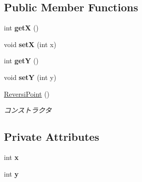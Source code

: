 \subsection*{Public Member Functions}
\begin{DoxyCompactItemize}
\item 
\mbox{\label{classjp_1_1gr_1_1java__conf_1_1yuta__yoshinaga_1_1reversi_1_1model_1_1_reversi_point_a9deacf20cc344a6ce93f5130007520d4}} 
int {\bfseries getX} ()
\item 
\mbox{\label{classjp_1_1gr_1_1java__conf_1_1yuta__yoshinaga_1_1reversi_1_1model_1_1_reversi_point_aa4fc225099dad8c9ca909d498d8a951a}} 
void {\bfseries setX} (int x)
\item 
\mbox{\label{classjp_1_1gr_1_1java__conf_1_1yuta__yoshinaga_1_1reversi_1_1model_1_1_reversi_point_a372b0b4d2fce6bfbebfe2e3255b04363}} 
int {\bfseries getY} ()
\item 
\mbox{\label{classjp_1_1gr_1_1java__conf_1_1yuta__yoshinaga_1_1reversi_1_1model_1_1_reversi_point_a831d47ed878457d9b6eb03dc172cbadc}} 
void {\bfseries setY} (int y)
\item 
\mbox{\hyperlink{classjp_1_1gr_1_1java__conf_1_1yuta__yoshinaga_1_1reversi_1_1model_1_1_reversi_point_a0d214a37c3858ca54e26cc6d5adb2c0b}{Reversi\+Point}} ()
\begin{DoxyCompactList}\small\item\em コンストラクタ \end{DoxyCompactList}\end{DoxyCompactItemize}
\subsection*{Private Attributes}
\begin{DoxyCompactItemize}
\item 
\mbox{\label{classjp_1_1gr_1_1java__conf_1_1yuta__yoshinaga_1_1reversi_1_1model_1_1_reversi_point_af41c34bc1ea9531eb815cfc74bccd0c1}} 
int {\bfseries x}
\item 
\mbox{\label{classjp_1_1gr_1_1java__conf_1_1yuta__yoshinaga_1_1reversi_1_1model_1_1_reversi_point_a39c67072f0ee5bcf0b8c6c03b1c10ed8}} 
int {\bfseries y}
\end{DoxyCompactItemize}


